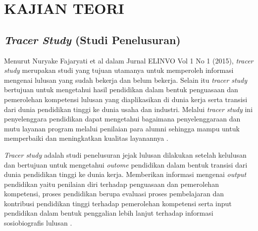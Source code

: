 
\chapter{KAJIAN TEORI}                

\section{\textit{Tracer Study} (Studi Penelusuran)}

Menurut Nuryake Fajaryati et al dalam Jurnal ELINVO Vol 1 No 1 (2015), \textit{tracer study} merupakan studi yang tujuan utamanya untuk memperoleh informasi mengenai lulusan yang sudah bekerja dan belum bekerja. Selain itu \textit{tracer study} bertujuan untuk mengetahui hasil pendidikan dalam bentuk penguasaan dan pemerolehan kompetensi lulusan yang diaplikasikan di dunia kerja serta transisi dari dunia pendidikan tinggi ke dunia usaha dan industri. Melalui \textit{tracer study} ini penyelenggara pendidikan dapat mengetahui bagaimana penyelenggaraan dan mutu layanan program melalui penilaian para alumni sehingga mampu untuk memperbaiki dan meningkatkan kualitas layanannya \cite{Nuryake}. 

\textit{Tracer study} adalah studi penelusuran jejak lulusan dilakukan setelah kelulusan dan bertujuan untuk mengetahui \textit{outome} pendidikan dalam bentuk transisi dari dunia pendidikan tinggi ke dunia kerja. Memberikan informasi mengenai \textit{output} pendidikan yaitu penilaian diri terhadap penguasaan dan pemerolehan kompetensi, proses pendidikan berupa evaluasi proses pembelajaran dan kontribusi pendidikan tinggi terhadap pemerolehan kompetensi serta input pendidikan dalam bentuk penggalian lebih lanjut terhadap informasi sosiobiografis lulusan \cite{ExploringTS}.

